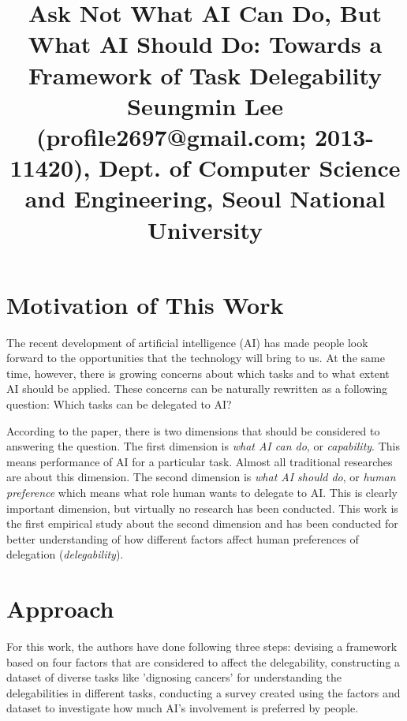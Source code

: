 \documentclass[10pt,twocolumn,letterpaper]{article}
\begin{document}
\title{Ask Not What AI Can Do, But What AI Should Do: Towards a Framework of Task Delegability \\ {\rm {\normalsize Seungmin Lee (profile2697@gmail.com; 2013-11420), Dept. of Computer Science and Engineering, Seoul National University}}}   %

\maketitle
\thispagestyle{empty}


\section{Motivation of This Work}
The recent development of artificial intelligence (AI) has made people look forward to the opportunities that the technology will bring to us. At the same time, however, there is growing concerns about which tasks and to what extent AI should be applied. These concerns can be naturally rewritten as a following question: Which tasks can be delegated to AI? 

According to the paper, there is two dimensions that should be considered to answering the question. The first dimension is \textit{what AI can do}, or \textit{capability}. This means performance of AI for a particular task. Almost all traditional researches are about this dimension. The second dimension is \textit{what AI should do}, or \textit{human preference} which means what role human wants to delegate to AI. This is clearly important dimension, but virtually no research has been conducted. This work is the first empirical study about the second dimension and has been conducted for better understanding of how different factors affect human preferences of delegation (\textit{delegability}). 

\section{Approach}
For this work, the authors have done following three steps: devising a framework based on four factors that are considered to affect the delegability, constructing a dataset of diverse tasks like 'dignosing cancers' for understanding the delegabilities in different tasks, conducting a survey created using the factors and dataset to investigate how much AI's involvement is preferred by people. 
\end{document}
